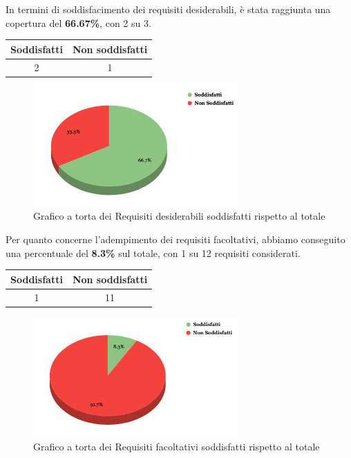 In termini di soddisfacimento dei requisiti desiderabili, è stata raggiunta una copertura del \textbf{66.67\%}, con 2 su 3.
\begin{center}
\begin{tabular}{|c|c|}
\hline
\textbf{Soddisfatti} & \textbf{Non soddisfatti} \\
\hline
2 & 1 \\
\hline
\end{tabular}
\end{center}

\begin{figure}[H]
    \centering
    \includegraphics[width=0.7\textwidth]{img/RequisitiDesiderabili.png}
    \caption{Grafico a torta dei Requisiti desiderabili soddisfatti rispetto al totale}
\end{figure}
\newpage

Per quanto concerne l’adempimento dei requisiti facoltativi, abbiamo conseguito una percentuale del \textbf{8.3\%} sul totale, con 1 su 12 requisiti considerati.
\begin{center}
    \begin{tabular}{|c|c|}
    \hline
    \textbf{Soddisfatti} & \textbf{Non soddisfatti} \\
    \hline
    1 & 11 \\
    \hline
    \end{tabular}
    \end{center}

    \begin{figure}[H]
        \centering
        \includegraphics[width=0.7\textwidth]{img/RequisitiFacoltativi.png}
        \caption{Grafico a torta dei Requisiti facoltativi soddisfatti rispetto al totale}
    \end{figure}
